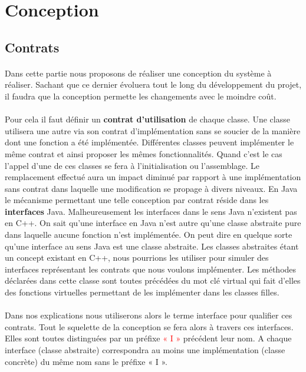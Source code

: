 \documentclass[a4paper, 10pt]{report}
\begin{document}
\section{Conception}
\subsection{Contrats}
\paragraph*{}
Dans cette partie nous proposons de réaliser une conception du système à réaliser. Sachant que ce dernier évoluera tout 
le long du développement du projet, il faudra que la conception permette les changements avec le moindre coût. 
\paragraph*{}
Pour cela il faut définir un \textbf{contrat d’utilisation} de chaque classe. Une classe utilisera une autre via son contrat 
d’implémentation sans se soucier de la manière dont une fonction a été implémentée. Différentes classes peuvent 
implémenter le même contrat et ainsi proposer les mêmes fonctionnalités. Quand c’est le cas l’appel d’une de ces classes 
se fera à l’initialisation ou l’assemblage. Le remplacement effectué aura un impact diminué par rapport à une implémentation 
sans contrat dans laquelle une modification se propage à divers niveaux. \newline
En Java le mécanisme permettant une telle conception par contrat réside dans les \textbf{interfaces} Java. Malheureusement 
les interfaces dans le sens Java n’existent pas en C++. On sait qu’une interface en Java n’est autre qu’une classe 
abstraite pure dans laquelle aucune fonction n’est implémentée. On peut dire en quelque sorte qu’une interface au sens 
Java est une classe abstraite. Les classes abstraites étant un concept existant en C++, nous pourrions les utiliser 
pour simuler des interfaces représentant les contrats que nous voulons implémenter. Les méthodes déclarées dans cette 
classe sont toutes précédées du mot clé virtual qui fait d’elles des fonctions virtuelles permettant de les implémenter 
dans les classes filles.
\paragraph*{}
Dans nos explications nous utiliserons alors le terme interface pour qualifier ces contrats. Tout le squelette de la 
conception se fera alors à travers ces interfaces. Elles sont toutes distinguées par un préfixe \textcolor{red}{« I »} précédent leur nom. 
A chaque interface (classe abstraite) correspondra au moins une implémentation (classe concrète) du même nom sans le 
préfixe « I ».
\end{document}
